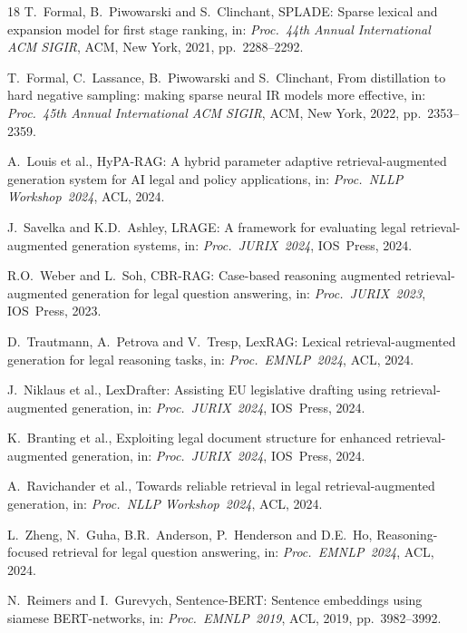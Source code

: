 \documentclass[sigconf,screen]{acmart}
\begin{document}
\begin{thebibliography}{18}
T.~Formal, B.~Piwowarski and S.~Clinchant,
{SPLADE}: Sparse lexical and expansion model for first stage ranking,
in: \textit{Proc.\ 44th Annual International ACM SIGIR}, ACM,
New York, 2021, pp.~2288--2292.

T.~Formal, C.~Lassance, B.~Piwowarski and S.~Clinchant,
From distillation to hard negative sampling: making sparse neural
{IR} models more effective,
in: \textit{Proc.\ 45th Annual International ACM SIGIR}, ACM,
New York, 2022, pp.~2353--2359.


A.~Louis et al.,
{HyPA-RAG}: A hybrid parameter adaptive retrieval-augmented
generation system for {AI} legal and policy applications,
in: \textit{Proc.\ NLLP Workshop~2024}, ACL, 2024.

J.~Savelka and K.D.~Ashley,
{LRAGE}: A framework for evaluating legal retrieval-augmented
generation systems,
in: \textit{Proc.\ JURIX~2024}, IOS~Press, 2024.

R.O.~Weber and L.~Soh,
{CBR-RAG}: Case-based reasoning augmented retrieval-augmented
generation for legal question answering,
in: \textit{Proc.\ JURIX~2023}, IOS~Press, 2023.

D.~Trautmann, A.~Petrova and V.~Tresp,
{LexRAG}: Lexical retrieval-augmented generation for legal reasoning
tasks,
in: \textit{Proc.\ EMNLP~2024}, ACL, 2024.

J.~Niklaus et al.,
{LexDrafter}: Assisting {EU} legislative drafting using
retrieval-augmented generation,
in: \textit{Proc.\ JURIX~2024}, IOS~Press, 2024.

K.~Branting et al.,
Exploiting legal document structure for enhanced
retrieval-augmented generation,
in: \textit{Proc.\ JURIX~2024}, IOS~Press, 2024.


A.~Ravichander et al.,
Towards reliable retrieval in legal retrieval-augmented generation,
in: \textit{Proc.\ NLLP Workshop~2024}, ACL, 2024.

L.~Zheng, N.~Guha, B.R.~Anderson, P.~Henderson and D.E.~Ho,
Reasoning-focused retrieval for legal question answering,
in: \textit{Proc.\ EMNLP~2024}, ACL, 2024.


N.~Reimers and I.~Gurevych,
Sentence-{BERT}: Sentence embeddings using siamese {BERT}-networks,
in: \textit{Proc.\ EMNLP~2019}, ACL, 2019, pp.~3982--3992.

\end{thebibliography}
\end{document}
